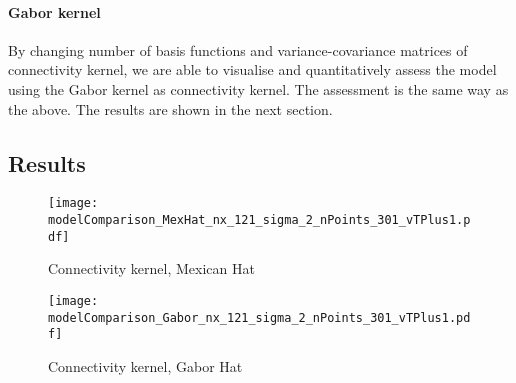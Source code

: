 \documentclass[a4paper, 12pt, english]{article}
\begin{document}
\paragraph{Gabor kernel\newline}
By changing number of basis functions and variance-covariance matrices of
connectivity kernel, we are able to visualise and quantitatively assess the model
using the Gabor kernel as connectivity kernel. The assessment is the same way as the above.
The results are shown in the next section.


\subsection{Results}

\begin{figure}[H]
\centering
\texttt{[image: modelComparison\_MexHat\_nx\_121\_sigma\_2\_nPoints\_301\_vTPlus1.pdf]}
\caption{Connectivity kernel, Mexican Hat}
\end{figure}

\begin{figure}[H]
\centering
\texttt{[image: modelComparison\_Gabor\_nx\_121\_sigma\_2\_nPoints\_301\_vTPlus1.pdf]}
\caption{Connectivity kernel, Gabor Hat}
\end{figure}
\end{document}
